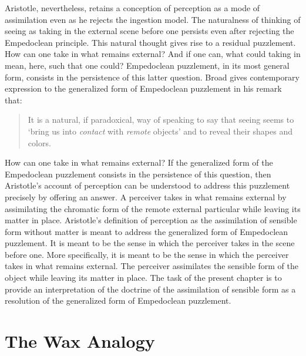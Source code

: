 Aristotle, nevertheless, retains a conception of perception as a mode of assimilation even as he rejects the ingestion model. The naturalness of thinking of seeing as taking in the external scene before one persists even after rejecting the Empedoclean principle. This natural thought gives rise to a residual puzzlement. How can one take in what remains external? And if one can, what could taking in mean, here, such that one could? Empedoclean puzzlement, in its most general form, consists in the persistence of this latter question. Broad gives contemporary expression to the generalized form of Empedoclean puzzlement in his remark that:
\begin{quote}
    It is a natural, if paradoxical, way of speaking to say that seeing seems to `bring us into \emph{contact} with \emph{remote} objects' and to reveal their shapes and colors. \citep[33]{Broad:1952kx}
\end{quote}

How can one take in what remains external? If the generalized form of the Empedoclean puzzlement consists in the persistence of this question, then Aristotle's account of perception can be understood to address this puzzlement precisely by offering an answer. A perceiver takes in what remains external by assimilating the chromatic form of the remote external particular while leaving its matter in place. Aristotle's definition of perception as the assimilation of sensible form without matter is meant to address the generalized form of Empedoclean puzzlement. It is meant to be the sense in which the perceiver takes in the scene before one. More specifically, it is meant to be the sense in which the perceiver takes in what remains external. The perceiver assimilates the sensible form of the object while leaving its matter in place. The task of the present chapter is to provide an interpretation of the doctrine of the assimilation of sensible form as a resolution of the generalized form of Empedoclean puzzlement.


\section{The Wax Analogy} %
\label{sec:the_wax_analogy}

